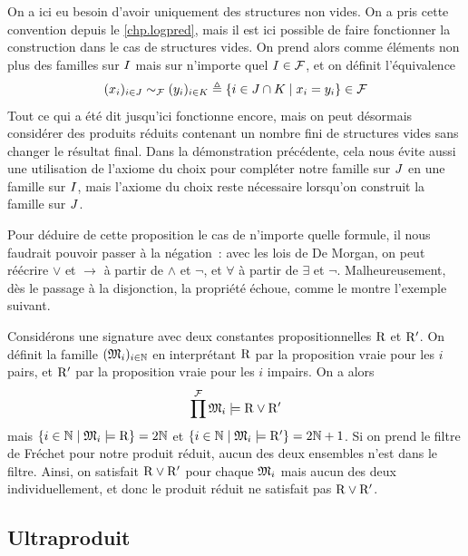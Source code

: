 \begin{remark}
  On a ici eu besoin d'avoir uniquement des structures non vides. On a pris
  cette convention depuis le \cref{chp.logpred}, mais il est ici possible de
  faire fonctionner la construction dans le cas de structures vides. On
  prend alors comme éléments non plus des familles sur $I$ mais sur
  n'importe quel $I \in \mathcal{F}$, et on définit l'équivalence
  \[(x_i)_{i \in J} \sim_{\mathcal{F}} (y_i)_{i \in K} \triangleq
  \left\{ i \in J \cap K \;\middle\vert\; x_i = y_i \right\} \in \mathcal{F}\]
  Tout ce qui a été dit jusqu'ici fonctionne encore, mais on peut désormais
  considérer des produits réduits contenant un nombre fini de structures
  vides sans changer le résultat final. Dans la démonstration précédente,
  cela nous évite aussi une utilisation de l'axiome du choix pour compléter
  notre famille sur $J$ en une famille sur $I$, mais l'axiome du
  choix reste nécessaire lorsqu'on construit la famille sur $J$.
\end{remark}

Pour déduire de cette proposition le cas de n'importe quelle formule, il nous
faudrait pouvoir passer à la négation~: avec les lois de De Morgan, on peut
réécrire $\lor$ et $\to$ à partir de $\land$ et $\lnot$, et $\forall$ à partir
de $\exists$ et $\lnot$. Malheureusement, dès le passage à la disjonction, la
propriété échoue, comme le montre l'exemple suivant.

\begin{example}
  Considérons une signature avec deux constantes propositionnelles $\mathrm{R}$ et
  $\mathrm{R}'$.
  On définit la famille $(\mathfrak{M}_i)_{i \in \mathbb N}$ en interprétant $\mathrm{R}$ par la
  proposition vraie pour les $i$ pairs, et $\mathrm{R}'$ par la proposition vraie
  pour les $i$ impairs. On a alors
  \[\prod^{\mathcal{F}}\mathfrak{M}_i\models \mathrm{R}\lor\mathrm{R}'\]
  mais $\left\{ i \in \mathbb N \;\middle\vert\; \mathfrak{M}_i\models\mathrm{R} \right\} = 2\mathbb N$ et
  $\left\{ i \in \mathbb N \;\middle\vert\; \mathfrak{M}_i\models\mathrm{R}' \right\} = 2\mathbb N + 1$. Si on prend le filtre
  de Fréchet pour notre produit réduit, aucun des deux ensembles n'est dans le
  filtre. Ainsi, on satisfait $\mathrm{R}\lor\mathrm{R}'$ pour chaque $\mathfrak{M}_i$
  mais aucun des deux individuellement, et donc le produit réduit ne satisfait
  pas $\mathrm{R}\lor\mathrm{R}'$.
\end{example}

\subsection{Ultraproduit}

